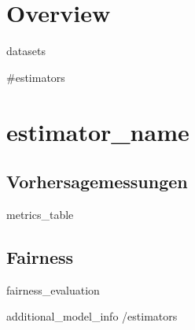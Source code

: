 \documentclass{article}
\begin{document}
\tableofcontents

\section{Overview}

{{{datasets}}}

{{#estimators}}
\clearpage
\section{ {{estimator_name}} }

\subsection{Vorhersagemessungen}
{{{metrics_table}}}

\subsection{Fairness}
{{{fairness_evaluation}}}

{{{additional_model_info}}}
{{/estimators}}
\end{document}
